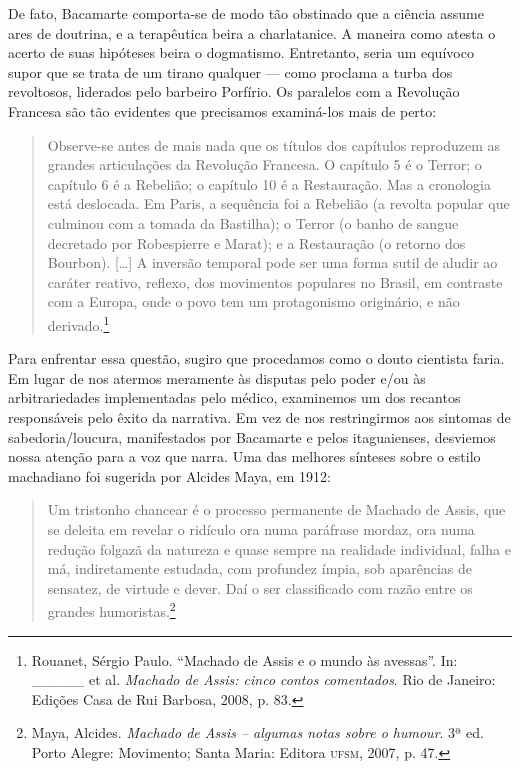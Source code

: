 De fato, Bacamarte comporta-se de modo tão obstinado que a ciência
assume ares de doutrina, e a terapêutica beira a charlatanice. A maneira
como atesta o acerto de suas hipóteses beira o dogmatismo. Entretanto,
seria um equívoco supor que se trata de um tirano qualquer --- como
proclama a turba dos revoltosos, liderados pelo barbeiro Porfírio. Os
paralelos com a Revolução Francesa são tão evidentes que precisamos
examiná-los mais de perto:

\begin{quote}
Observe-se antes de mais nada que os títulos dos capítulos reproduzem as
grandes articulações da Revolução Francesa. O capítulo 5 é o Terror; o
capítulo 6 é a Rebelião; o capítulo 10 é a Restauração. Mas a cronologia
está deslocada. Em Paris, a sequência foi a Rebelião (a revolta popular
que culminou com a tomada da Bastilha); o Terror (o banho de sangue
decretado por Robespierre e Marat); e a Restauração (o retorno dos
Bourbon). {[}\ldots{}{]} A inversão temporal pode ser uma forma sutil de
aludir ao caráter reativo, reflexo, dos movimentos populares no Brasil,
em contraste com a Europa, onde o povo tem um protagonismo originário, e
não derivado.\footnote{Rouanet, Sérgio Paulo. ``Machado de Assis e o
  mundo às avessas''. In: \_\_\_\_\_ et al. \emph{Machado de Assis:
  cinco contos comentados}. Rio de Janeiro: Edições Casa de Rui Barbosa,
  2008, p. 83.}
\end{quote}

Para enfrentar essa questão, sugiro que procedamos como o douto
cientista faria. Em lugar de nos atermos meramente às disputas pelo
poder e/ou às arbitrariedades implementadas pelo médico, examinemos um
dos recantos responsáveis pelo êxito da narrativa. Em vez de nos
restringirmos aos sintomas de sabedoria/loucura, manifestados por
Bacamarte e pelos itaguaienses, desviemos nossa atenção para a voz que
narra. Uma das melhores sínteses sobre o estilo machadiano foi sugerida
por Alcides Maya, em 1912:

\begin{quote}
Um tristonho chancear é o processo permanente de Machado de Assis, que
se deleita em revelar o ridículo ora numa paráfrase mordaz, ora numa
redução folgazã da natureza e quase sempre na realidade individual,
falha e má, indiretamente estudada, com profundez ímpia, sob aparências
de sensatez, de virtude e dever. Daí o ser classificado com razão entre
os grandes humoristas.\footnote{Maya, Alcides. \emph{Machado de Assis --
  algumas notas sobre o humour}. 3ª ed. Porto Alegre: Movimento; Santa
  Maria: Editora \textsc{ufsm}, 2007, p. 47.}
\end{quote}

